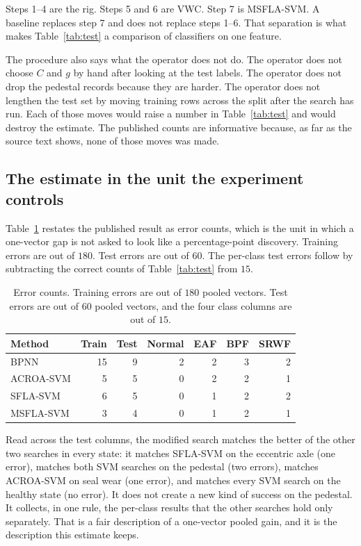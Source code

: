 Steps 1--4 are the rig.
Steps 5 and 6 are VWC.
Step 7 is MSFLA-SVM.
A baseline replaces step 7 and does not replace steps 1--6.
That separation is what makes Table~\ref{tab:test} a comparison of classifiers on one feature.

The procedure also says what the operator does not do.
The operator does not choose \(C\) and \(g\) by hand after looking at the test labels.
The operator does not drop the pedestal records because they are harder.
The operator does not lengthen the test set by moving training rows across the split after the search has run.
Each of those moves would raise a number in Table~\ref{tab:test} and would destroy the estimate.
The published counts are informative because, as far as the source text shows, none of those moves was made.

\subsection{The estimate in the unit the experiment controls}
\label{sec:unit}

Table~\ref{tab:errors} restates the published result as error counts, which is the unit in which a one-vector gap is not asked to look like a percentage-point discovery.
Training errors are out of \(180\).
Test errors are out of \(60\).
The per-class test errors follow by subtracting the correct counts of Table~\ref{tab:test} from \(15\).

\begin{table}[H]
\centering
\caption{Error counts. Training errors are out of \(180\) pooled vectors. Test errors are out of \(60\) pooled vectors, and the four class columns are out of \(15\).}
\label{tab:errors}
\begin{tabular}{lrrrrrr}
\toprule
Method & Train & Test & Normal & EAF & BPF & SRWF \\
\midrule
BPNN & 15 & 9 & 2 & 2 & 3 & 2 \\
ACROA-SVM & 5 & 5 & 0 & 2 & 2 & 1 \\
SFLA-SVM & 6 & 5 & 0 & 1 & 2 & 2 \\
MSFLA-SVM & 3 & 4 & 0 & 1 & 2 & 1 \\
\bottomrule
\end{tabular}
\end{table}

Read across the test columns, the modified search matches the better of the other two searches in every state: it matches SFLA-SVM on the eccentric axle (one error), matches both SVM searches on the pedestal (two errors), matches ACROA-SVM on seal wear (one error), and matches every SVM search on the healthy state (no error).
It does not create a new kind of success on the pedestal.
It collects, in one rule, the per-class results that the other searches hold only separately.
That is a fair description of a one-vector pooled gain, and it is the description this estimate keeps.

